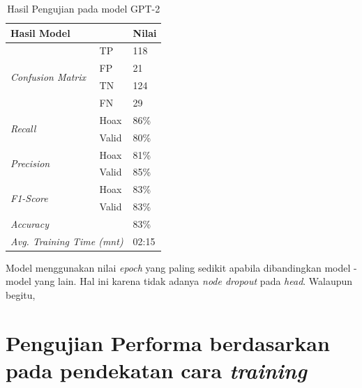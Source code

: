 \begin{table}[h]
    \caption{Hasil Pengujian pada model GPT-2}
    \label{tab: loss_gpt}
    \centering
    \begin{tabular}{|l|l|l|}
        \hline
        \multicolumn{2}{|l|}{\textbf{Hasil Model}}              & \textbf{Nilai}        \\ \hline
        \multirow{4}{*}{\textit{Confusion Matrix}}              & TP             & 118  \\ \cline{2-3}
                                                                & FP             & 21   \\ \cline{2-3}
                                                                & TN             & 124  \\ \cline{2-3}
                                                                & FN             & 29   \\ \hline
        \multirow{2}{*}{\textit{Recall}}                        & Hoax           & 86\% \\ \cline{2-3}
                                                                & Valid          & 80\% \\ \hline
        \multirow{2}{*}{\textit{Precision}}                     & Hoax           & 81\% \\ \cline{2-3}
                                                                & Valid          & 85\% \\ \hline
        \multirow{2}{*}{\textit{F1-Score}}                      & Hoax           & 83\% \\ \cline{2-3}
                                                                & Valid          & 83\% \\ \hline
        \multicolumn{2}{|l|}{\textit{Accuracy}}                 & 83\%                  \\ \hline
        \multicolumn{2}{|l|}{\textit{Avg. Training Time (mnt)}} & 02:15                 \\ \hline
    \end{tabular}
\end{table}

Model menggunakan nilai \textit{epoch} yang paling sedikit apabila dibandingkan model - model yang lain. Hal ini karena tidak adanya \textit{node dropout} pada \textit{head}. Walaupun begitu,


\section{Pengujian Performa berdasarkan pada pendekatan cara \textit{training}}

